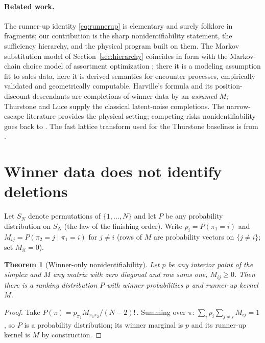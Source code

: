 \documentclass[11pt]{article}
\newtheorem{theorem}{Theorem}
\theoremstyle{remark}
\begin{document}
\paragraph{Related work.} The runner-up identity \eqref{eq:runnerup} is elementary
and surely folklore in fragments; our contribution is the sharp nonidentifiability
statement, the sufficiency hierarchy, and the physical program built on them. The
Markov substitution model of Section~\ref{sec:hierarchy} coincides in form with the
Markov-chain choice model of assortment optimization \cite{blanchet2016}; there it
is a modeling assumption fit to sales data, here it is derived semantics for
encounter processes, empirically validated and geometrically computable. Harville's
formula \cite{harville1973} and its position-discount descendants are completions of
winner data by an \emph{assumed} $M$; Thurstone \cite{thurstone1927} and Luce
\cite{luce1959} supply the classical latent-noise completions. The narrow-escape
literature \cite{holcman2014} provides the physical setting; competing-risks
nonidentifiability goes back to \cite{cox1959,tsiatis1975}. The fast lattice
transform used for the Thurstone baselines is from \cite{cotton2021}.

\section{Winner data does not identify deletions}

Let $S_N$ denote permutations of $\{1,\dots,N\}$ and let $P$ be any probability
distribution on $S_N$ (the law of the finishing order). Write $p_i = P(\pi_1 = i)$
and $M_{ij} = P(\pi_2 = j \mid \pi_1 = i)$ for $j \ne i$ (rows of $M$ are
probability vectors on $\{j \ne i\}$; set $M_{ii} = 0$).

\begin{theorem}[Winner-only nonidentifiability]\label{thm:nonid}
Let $p$ be any interior point of the simplex and $M$ any matrix with zero diagonal
and row sums one, $M_{ij} \ge 0$. Then there is a ranking distribution $P$ with
winner probabilities $p$ and runner-up kernel $M$.
\end{theorem}

\begin{proof}
Take $P(\pi) = p_{\pi_1} M_{\pi_1 \pi_2} / (N-2)!$\,. Summing over $\pi$:
$\sum_i p_i \sum_{j \ne i} M_{ij} = 1$, so $P$ is a probability distribution; its
winner marginal is $p$ and its runner-up kernel is $M$ by construction.
\end{proof}
\end{document}
